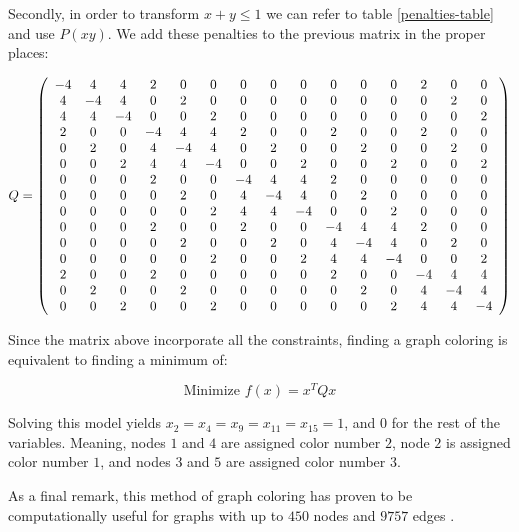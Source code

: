 Secondly, in order to transform $x + y \leq 1$ we can refer to table \ref{penalties-table} and use $P(xy)$. We add these penalties to the previous matrix in the proper places:

$$
Q = 
\left(
\begin{array}{*{15}c}
	-4 & 4 & 4 & 2 & 0 & 0 & 0 & 0 & 0 & 0 & 0 & 0 & 2 & 0 & 0 \\
	4 & -4 & 4 & 0 & 2 & 0 & 0 & 0 & 0 & 0 & 0 & 0 & 0 & 2 & 0 \\
	4 & 4 & -4 & 0 & 0 & 2 & 0 & 0 & 0 & 0 & 0 & 0 & 0 & 0 & 2 \\
	2 & 0 & 0 & -4 & 4 & 4 & 2 & 0 & 0 & 2 & 0 & 0 & 2 & 0 & 0 \\
	0 & 2 & 0 & 4 & -4 & 4 & 0 & 2 & 0 & 0 & 2 & 0 & 0 & 2 & 0 \\
	0 & 0 & 2 & 4 & 4 & -4 & 0 & 0 & 2 & 0 & 0 & 2 & 0 & 0 & 2 \\
	0 & 0 & 0 & 2 & 0 & 0 & -4 & 4 & 4 & 2 & 0 & 0 & 0 & 0 & 0 \\
	0 & 0 & 0 & 0 & 2 & 0 & 4 & -4 & 4 & 0 & 2 & 0 & 0 & 0 & 0 \\
	0 & 0 & 0 & 0 & 0 & 2 & 4 & 4 & -4 & 0 & 0 & 2 & 0 & 0 & 0 \\
	0 & 0 & 0 & 2 & 0 & 0 & 2 & 0 & 0 & -4 & 4 & 4 & 2 & 0 & 0 \\
	0 & 0 & 0 & 0 & 2 & 0 & 0 & 2 & 0 & 4 & -4 & 4 & 0 & 2 & 0 \\
	0 & 0 & 0 & 0 & 0 & 2 & 0 & 0 & 2 & 4 & 4 & -4 & 0 & 0 & 2 \\
	2 & 0 & 0 & 2 & 0 & 0 & 0 & 0 & 0 & 2 & 0 & 0 & -4 & 4 & 4 \\
	0 & 2 & 0 & 0 & 2 & 0 & 0 & 0 & 0 & 0 & 2 & 0 & 4 & -4 & 4 \\
	0 & 0 & 2 & 0 & 0 & 2 & 0 & 0 & 0 & 0 & 0 & 2 & 4 & 4 & -4 
\end{array}
\right)
$$

Since the matrix above incorporate all the constraints, finding a graph coloring is equivalent to finding a minimum of:

$$ \text{Minimize } f(x) = x^T Q x $$

Solving this model yields $x_2 = x_4 = x_9 = x_{11} = x_{15} = 1$, and $0$ for the rest of the variables. Meaning, nodes $1$ and $4$ are assigned color number $2$, node $2$ is assigned color number $1$, and nodes $3$ and $5$ are assigned color number $3$.

As a final remark, this method of graph coloring has proven to be computationally useful for graphs with up to $450$ nodes and $9757$ edges \cite{Kochenberger2005}.


